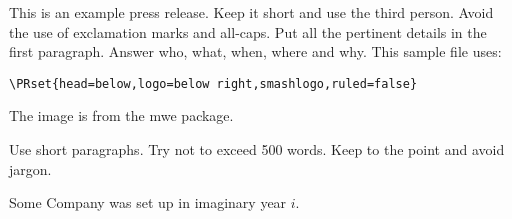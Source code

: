 \documentclass[a4paper,11pt]{pressrelease}
\begin{document}
\begin{pressrelease}

This is an example press release. Keep it short and use the third
person. Avoid the use of exclamation marks and all-caps. Put all the
pertinent details in the first paragraph. Answer who, what, when,
where and why. This sample file uses:
\begin{verbatim}
\PRset{head=below,logo=below right,smashlogo,ruled=false}
\end{verbatim}
The image is from the \textsf{mwe} package.

Use short paragraphs. Try not to exceed 500 words. Keep to the point
and avoid jargon.

\begin{about}
Some Company was set up in imaginary year $i$.
\end{about}

\end{pressrelease}
\end{document}
